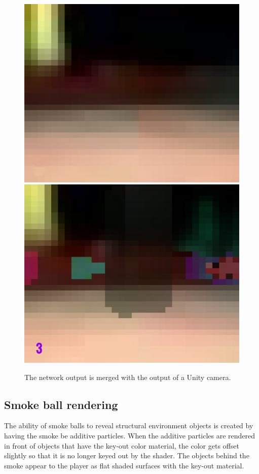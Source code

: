 \begin{figure}[p]
  \centering
  \includegraphics[width=\imgWidth]{images/neural_network_systems/NoOverlay.png} \\[\picVdist]
  \includegraphics[width=\imgWidth]{images/neural_network_systems/WithOverlay.png}
  \caption{The network output is merged with the output of a Unity camera.}
  \label{RenderMerge}
\end{figure}


\subsection{Smoke ball rendering}\label{SmokeBallRendering}
The ability of smoke balls to reveal structural environment objects is created by having the smoke be additive particles. When the additive particles are rendered in front of objects that have the key-out color material, the color gets offset slightly so that it is no longer keyed out by the shader. The objects behind the smoke appear to the player as flat shaded surfaces with the key-out material.

